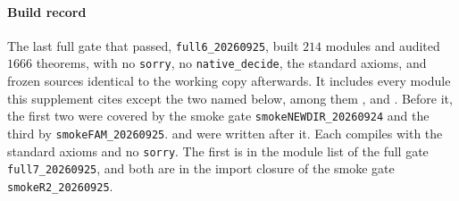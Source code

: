 
\paragraph{Build record} The last full gate that passed, \texttt{full6\_20260925}, built $214$
modules and audited $1666$ theorems, with no \texttt{sorry}, no \texttt{native\_decide}, the
standard axioms, and frozen sources identical to the working copy afterwards. It includes every
module this supplement cites except the two named below, among
them ,  and
. Before it, the first two were covered by the smoke gate
\texttt{smokeNEWDIR\_20260924} and the third by \texttt{smokeFAM\_20260925}.
 and  were written after it.
Each compiles with the standard axioms and no \texttt{sorry}. The first is in the module list of the
full gate \texttt{full7\_20260925}, and both are in the import closure of the smoke gate
\texttt{smokeR2\_20260925}.


